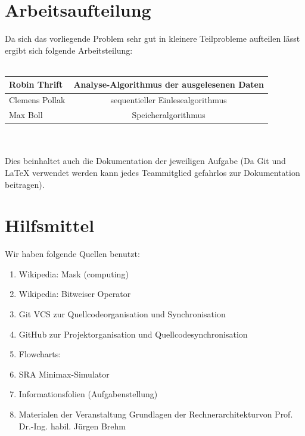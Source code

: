 \documentclass[12pt,titlepage]{article}
\begin{document}
\newpage

\section{Arbeitsaufteilung}
Da sich das vorliegende Problem sehr gut in kleinere Teilprobleme aufteilen lässt ergibt sich folgende 
Arbeitsteilung:
\leavevmode \\
\\
\begin{tabular}{|l|c|}
\hline
Robin Thrift &  Analyse-Algorithmus der ausgelesenen Daten \\
\hline
Clemens Pollak & sequentieller Einlesealgorithmus \\
\hline
Max Boll & Speicheralgorithmus \\
\hline
\end{tabular}
\leavevmode \\
\\
Dies beinhaltet auch die Dokumentation der jeweiligen Aufgabe (Da Git und LaTeX verwendet werden kann jedes 
Teammitglied gefahrlos zur Dokumentation beitragen).


\section{Hilfsmittel}
Wir haben folgende Quellen benutzt:
\begin{enumerate} 
\item Wikipedia: \dq Mask (computing)\dq \\ 
\item Wikipedia: \dq Bitweiser Operator\dq \\ 
\item Git VCS zur Quellcodeorganisation und Synchronisation
\item GitHub zur Projektorganisation und Quellcodesynchronisation
\item Flowcharts: 
\item SRA Minimax-Simulator
\item Informationsfolien (Aufgabenstellung)
\item Materialen der Veranstaltung \dq Grundlagen der Rechnerarchitektur\dq von Prof. Dr.-Ing. habil. Jürgen Brehm
\end{enumerate}
\end{document}
